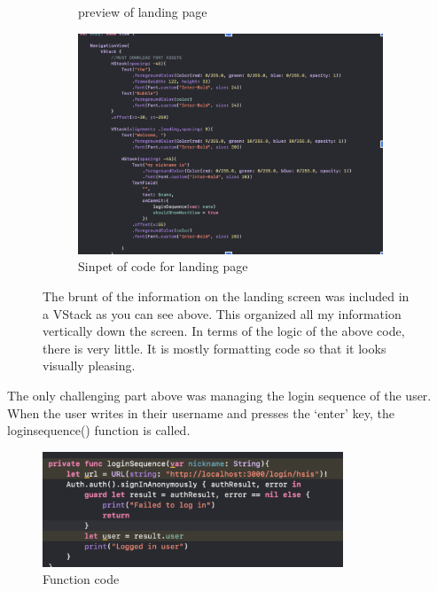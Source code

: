 \documentclass[a4paper, 11pt]{report}
\begin{document}
\begin{figure}
\begin{subfigure}[h]{0.5\textwidth}
    \caption{preview of landing page}
    \label{fig:image1}
  \end{subfigure}
  \hfill
  \begin{subfigure}[h]{0.7\textwidth}
    \includegraphics[width=\textwidth]{2.png}
    \caption{Sinpet of code for landing page}
    \label{fig:image2}
  \end{subfigure}
  \caption{The brunt of the information on the landing screen was included in a VStack as you can see above. This organized all my information vertically down the screen. In terms of the logic of the above code, there is very little. It is mostly formatting code so that it looks visually pleasing.\\}
  \label{fig:images}
\end{figure}


\newpage
The only challenging part above was managing the login sequence of the user. When the user writes in their username and presses the ‘enter’ key, the loginsequence() function is called.
\\
\begin{figure}[ht]
  \centering
  \includegraphics[width=0.8\textwidth]{3.png}
  \caption{Function code}
  \label{fig:example}
\end{figure}
\end{document}
